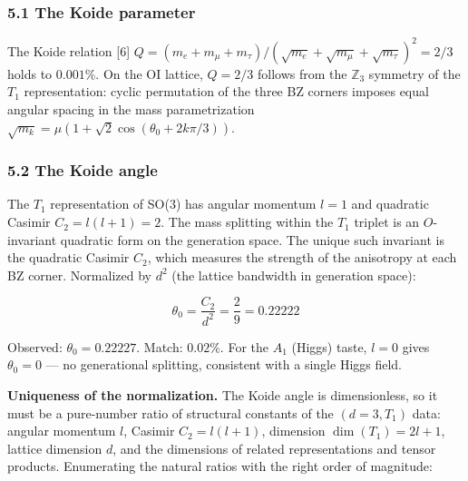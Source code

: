 \documentclass[
  11pt,
]{article}
\begin{document}
\hypertarget{the-koide-parameter}{%
\subsubsection{5.1 The Koide parameter}\label{the-koide-parameter}}

The Koide relation {[}6{]}
\(Q = (m_e + m_\mu + m_\tau)/(\sqrt{m_e} + \sqrt{m_\mu} + \sqrt{m_\tau})^2 = 2/3\)
holds to \(0.001\%\). On the OI lattice, \(Q = 2/3\) follows from the
\(\mathbb{Z}_3\) symmetry of the \(T_1\) representation: cyclic
permutation of the three BZ corners imposes equal angular spacing in the
mass parametrization
\(\sqrt{m_k} = \mu(1 + \sqrt{2}\cos(\theta_0 + 2k\pi/3))\).

\hypertarget{the-koide-angle}{%
\subsubsection{5.2 The Koide angle}\label{the-koide-angle}}

The \(T_1\) representation of SO(3) has angular momentum \(l = 1\) and
quadratic Casimir \(C_2 = l(l+1) = 2\). The mass splitting within the
\(T_1\) triplet is an \(O\)-invariant quadratic form on the generation
space. The unique such invariant is the quadratic Casimir \(C_2\), which
measures the strength of the anisotropy at each BZ corner. Normalized by
\(d^2\) (the lattice bandwidth in generation space):

\[\boxed{\theta_0 = \frac{C_2}{d^2} = \frac{2}{9} = 0.22222}\]

Observed: \(\theta_0 = 0.22227\). Match: \(0.02\%\). For the \(A_1\)
(Higgs) taste, \(l = 0\) gives \(\theta_0 = 0\) --- no generational
splitting, consistent with a single Higgs field.

\textbf{Uniqueness of the normalization.} The Koide angle is
dimensionless, so it must be a pure-number ratio of structural constants
of the \((d=3, T_1)\) data: angular momentum \(l\), Casimir
\(C_2 = l(l+1)\), dimension \(\dim(T_1) = 2l+1\), lattice dimension
\(d\), and the dimensions of related representations and tensor
products. Enumerating the natural ratios with the right order of
magnitude:
\end{document}

